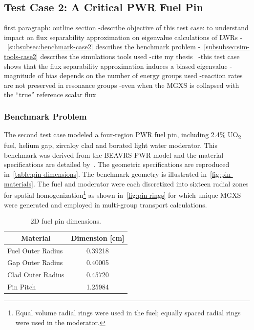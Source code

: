 \subsection{Test Case 2: A Critical PWR Fuel Pin}
\label{subsec:test-case2}

first paragraph: outline section
-describe objective of this test case: to understand impact on flux separability approximation on eigenvalue calculations of LWRs
-~\autoref{subsubsec:benchmark-case2} describes the benchmark problem
-~\autoref{subsubsec:sim-tools-case2} describes the simulations tools used
-cite my thesis~\cite{boyd2016thesis}
-this test case shows that the flux separability approximation induces a biased eigenvalue
  -magnitude of bias depends on the number of energy groups used
  -reaction rates are not preserved in resonance groups
  -even when the MGXS is collapsed with the ``true'' reference scalar flux

\subsubsection{Benchmark Problem}
\label{subsubsec:benchmark-case2}

The second test case modeled a four-region PWR fuel pin, including  2.4\% UO\textsubscript{2} fuel, helium gap, zircaloy clad and borated light water moderator. This benchmark was derived from the BEAVRS PWR model and the material specifications are detailed by~\cite{horelik2013beavrs}. The geometric specifications are reproduced in~\autoref{table:pin-dimensions}. The benchmark geometry is illustrated in~\autoref{fig:pin-materials}. The fuel and moderator were each discretized into sixteen radial zones for spatial homogenization\footnote{Equal volume radial rings were used in the fuel; equally spaced radial rings were used in the moderator.} as shown in~\autoref{fig:pin-rings} for which unique MGXS were generated and employed in multi-group transport calculations.

\begin{table}[h!]
  \centering
  \caption{2D fuel pin dimensions.}
  \label{table:pin-dimensions} 
  \begin{tabular}{l c}
  \toprule
  \multicolumn{1}{c}{\bf Material} &
  {\bf Dimension [cm]} \\
  \midrule
  Fuel Outer Radius & 0.39218 \\
  Gap Outer Radius &  0.40005 \\
  Clad Outer Radius & 0.45720 \\
  Pin Pitch &         1.25984 \\
  \bottomrule
\end{tabular}
\end{table}

